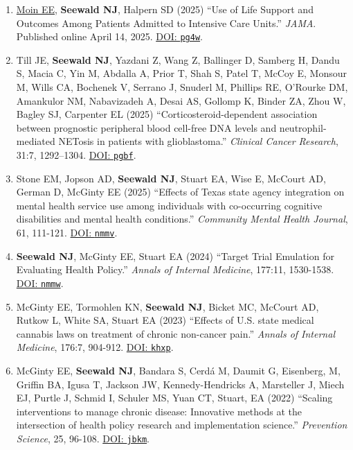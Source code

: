 \documentclass[letterpaper,11pt]{article} %
\begin{document}
	\begin{enumerate}
    
        \item \underline{Moin EE}, \textbf{Seewald NJ}, Halpern SD (2025) ``Use of Life Support and Outcomes Among Patients Admitted to Intensive Care Units.'' \textit{JAMA}. Published online April 14, 2025. \href{https://doi.org/pg4w}{DOI: \texttt{pg4w}}.
    
        \item Till JE, \textbf{Seewald NJ}, Yazdani Z, Wang Z, Ballinger D, Samberg H, Dandu S, Macia C, Yin M, Abdalla A, Prior T, Shah S, Patel T, McCoy E, Monsour M, Wills CA, Bochenek V, Serrano J, Snuderl M, Phillips RE, O'Rourke DM, Amankulor NM, Nabavizadeh A, Desai AS, Gollomp K, Binder ZA, Zhou W, Bagley SJ, Carpenter EL (2025) ``Corticosteroid-dependent association between prognostic peripheral blood cell-free DNA levels and neutrophil-mediated NETosis in patients with glioblastoma.'' \textit{Clinical Cancer Research}, 31:7, 1292–1304. \href{https://doi.org/pgbf}{DOI: \texttt{pgbf}}.

        \item Stone EM, Jopson AD, \textbf{Seewald NJ}, Stuart EA, Wise E, McCourt AD, German D, McGinty EE (2025) ``Effects of Texas state agency integration on mental health service use among individuals with co-occurring cognitive disabilities and mental health conditions.'' \textit{Community Mental Health Journal}, 61, 111-121. \href{https://doi.org/nmmv}{DOI: \texttt{nmmv}}.
        
		\item \textbf{Seewald NJ}, McGinty EE, Stuart EA (2024) ``Target Trial Emulation for Evaluating Health Policy.'' \textit{Annals of Internal Medicine}, 177:11, 1530-1538. \href{https://doi.org/nmmw}{DOI: \texttt{nmmw}}.
		
		\item McGinty EE, Tormohlen KN, \textbf{Seewald NJ}, Bicket MC, McCourt AD, Rutkow L, White SA, Stuart EA (2023) ``Effects of U.S. state medical cannabis laws on treatment of chronic non-cancer pain.'' \textit{Annals of Internal Medicine}, 176:7, 904-912. \href{https://doi.org/khxp}{DOI: \texttt{khxp}}.
		
		\item McGinty EE, \textbf{Seewald NJ}, Bandara S, Cerd\'{a} M, Daumit G, Eisenberg, M, Griffin BA, Igusa T, Jackson JW, Kennedy-Hendricks A, Marsteller J, Miech EJ, Purtle J, Schmid I, Schuler MS, Yuan CT, Stuart, EA (2022) ``Scaling interventions to manage chronic disease: Innovative methods at the intersection of health policy research and implementation science.'' \textit{Prevention Science}, 25, 96-108. \href{https://doi.org/jbkm}{DOI: \texttt{jbkm}}.
		

\end{enumerate}
\end{document}
